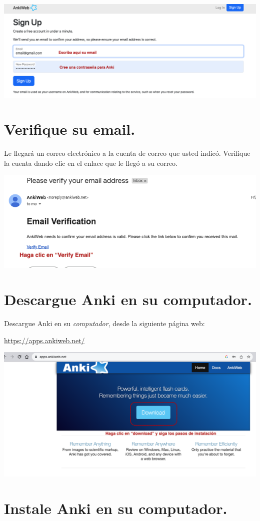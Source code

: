 \documentclass[
]{book}
\begin{document}
\includegraphics[width=0.9\linewidth]{images/reposit_sp/email_password}

\section{Verifique su email.}\label{verifique-su-email.}

Le llegará un correo electrónico a la cuenta de correo que usted indicó. Verifique la cuenta dando clic en el enlace que le llegó a su correo.

\includegraphics[width=0.9\linewidth]{images/reposit_sp/email_verification}

\section{Descargue Anki en su computador.}\label{descargue-anki-en-su-computador.}

Descargue Anki en su \emph{computador}, desde la siguiente página web:

\url{https://apps.ankiweb.net/}

\includegraphics[width=0.6\linewidth]{images/reposit_sp/download}

\section{Instale Anki en su computador.}\label{instale-anki-en-su-computador.}
\end{document}
